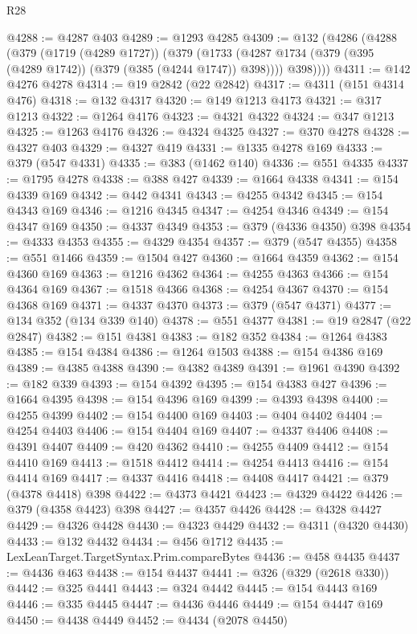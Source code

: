 \begin{lexlean}{R28}
\begin{coremodule}
@4288 := @4287 @403
@4289 := @1293 @4285
@4309 := @132
    (@4286
      (@4288
        (@379
          (@1719 (@4289 @1727))
          (@379
            (@1733 (@4287 @1734 (@379 (@395 (@4289 @1742)) (@379 (@385 (@4244 @1747)) @398))))
            @398))))
@4311 := @142 @4276 @4278
@4314 := @19 @2842 (@22 @2842)
@4317 := @4311 (@151 @4314 @476)
@4318 := @132 @4317
@4320 := @149 @1213 @4173
@4321 := @317 @1213
@4322 := @1264 @4176
@4323 := @4321 @4322
@4324 := @347 @1213
@4325 := @1263 @4176
@4326 := @4324 @4325
@4327 := @370 @4278
@4328 := @4327 @403
@4329 := @4327 @419
@4331 := @1335 @4278 @169
@4333 := @379 (@547 @4331)
@4335 := @383 (@1462 @140)
@4336 := @551 @4335
@4337 := @1795 @4278
@4338 := @388 @427
@4339 := @1664 @4338
@4341 := @154 @4339 @169
@4342 := @442 @4341
@4343 := @4255 @4342
@4345 := @154 @4343 @169
@4346 := @1216 @4345
@4347 := @4254 @4346
@4349 := @154 @4347 @169
@4350 := @4337 @4349
@4353 := @379 (@4336 @4350) @398
@4354 := @4333 @4353
@4355 := @4329 @4354
@4357 := @379 (@547 @4355)
@4358 := @551 @1466
@4359 := @1504 @427
@4360 := @1664 @4359
@4362 := @154 @4360 @169
@4363 := @1216 @4362
@4364 := @4255 @4363
@4366 := @154 @4364 @169
@4367 := @1518 @4366
@4368 := @4254 @4367
@4370 := @154 @4368 @169
@4371 := @4337 @4370
@4373 := @379 (@547 @4371)
@4377 := @134 @352 (@134 @339 @140)
@4378 := @551 @4377
@4381 := @19 @2847 (@22 @2847)
@4382 := @151 @4381
@4383 := @182 @352
@4384 := @1264 @4383
@4385 := @154 @4384
@4386 := @1264 @1503
@4388 := @154 @4386 @169
@4389 := @4385 @4388
@4390 := @4382 @4389
@4391 := @1961 @4390
@4392 := @182 @339
@4393 := @154 @4392
@4395 := @154 @4383 @427
@4396 := @1664 @4395
@4398 := @154 @4396 @169
@4399 := @4393 @4398
@4400 := @4255 @4399
@4402 := @154 @4400 @169
@4403 := @404 @4402
@4404 := @4254 @4403
@4406 := @154 @4404 @169
@4407 := @4337 @4406
@4408 := @4391 @4407
@4409 := @420 @4362
@4410 := @4255 @4409
@4412 := @154 @4410 @169
@4413 := @1518 @4412
@4414 := @4254 @4413
@4416 := @154 @4414 @169
@4417 := @4337 @4416
@4418 := @4408 @4417
@4421 := @379 (@4378 @4418) @398
@4422 := @4373 @4421
@4423 := @4329 @4422
@4426 := @379 (@4358 @4423) @398
@4427 := @4357 @4426
@4428 := @4328 @4427
@4429 := @4326 @4428
@4430 := @4323 @4429
@4432 := @4311 (@4320 @4430)
@4433 := @132 @4432
@4434 := @456 @1712
@4435 := LexLeanTarget.TargetSyntax.Prim.compareBytes
@4436 := @458 @4435
@4437 := @4436 @463
@4438 := @154 @4437
@4441 := @326 (@329 (@2618 @330))
@4442 := @325 @4441
@4443 := @324 @4442
@4445 := @154 @4443 @169
@4446 := @335 @4445
@4447 := @4436 @4446
@4449 := @154 @4447 @169
@4450 := @4438 @4449
@4452 := @4434 (@2078 @4450)

\end{coremodule}
\end{lexlean}
